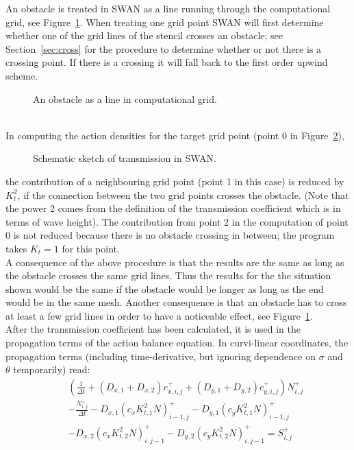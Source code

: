 \documentclass[12pt]{book}
\begin{document}
An obstacle is treated in SWAN as a line running through the computational grid, see Figure~\ref{fig:obsgrid}.
When treating one grid point SWAN will first determine whether one of the grid lines of the stencil
crosses an obstacle; see Section~\ref{sec:cross} for the procedure to determine whether or not there is a crossing point.
If there is a crossing it will fall back to the first order upwind scheme.
\begin{figure}[htb]
   \centerline{
              }
      \caption{An obstacle as a line in computational grid.}
      \label{fig:obsgrid}
\end{figure}
\\[2ex]
\noindent
In computing the action densities for the target grid point (point 0 in Figure~\ref{fig:stencil1}),
\begin{figure}[htb]
   \centerline{
              }
      \caption{Schematic sketch of transmission in SWAN.}
      \label{fig:stencil1}
\end{figure}
the contribution of a neighbouring grid point (point 1 in this case) is reduced by $K_t^2$,
if the connection between the two grid points crosses the obstacle.
(Note that the power 2 comes from the definition of the transmission coefficient which is
in terms of wave height).
The contribution from point 2 in the computation of point 0 is not reduced because there is no obstacle
crossing in between; the program takes $K_t=1$ for this point.
\\[2ex]
\noindent
A consequence of the above procedure is that the results are the same as long
as the obstacle crosses the same grid lines.
Thus the results for the the situation shown would be the same
if the obstacle would be longer as long as the end would be in the same mesh.
Another consequence is that an obstacle has to cross at least
a few grid lines in order to have a noticeable effect, see Figure~\ref{fig:obsgrid}.
\\[2ex]
\noindent
After the transmission coefficient has been calculated, it is used in
the propagation terms of the action balance equation.
In curvi-linear coordinates, the propagation terms
(including time-derivative, but ignoring dependence on
$\sigma$ and $\theta$ temporarily) read:
\begin{eqnarray}
  && \left ( \frac{1}{\Delta t} + (D_{x,1} + D_{x,2})c_{x,i,j}^+ + (D_{y,1}+D_{y,2}) c_{y,i,j}^+ \right ) N_{i,j}^+ \nonumber \\
  && - \frac{N_{i,j}^-}{\Delta t} - D_{x,1} (c_x K^2_{t,1} N)_{i-1,j}^+ - D_{y,1} (c_y K^2_{t,1} N)_{i-1,j}^+ \nonumber \\
  && - D_{x,2} (c_x K^2_{t,2} N)_{i,j-1}^+ - D_{y,2} (c_y K^2_{t,2} N)_{i,j-1}^+ = S_{i,j}^+
\end{eqnarray}
\end{document}
